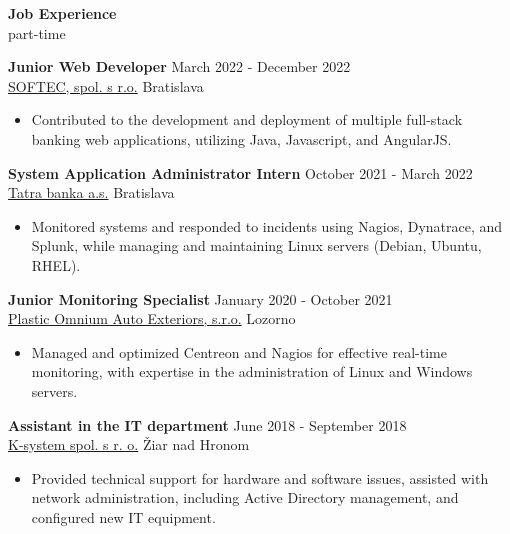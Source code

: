 \documentclass[12pt]{article}
\begin{document}
\vspace{0.2in} %

\begin{center}
	{\noindent \bfseries Job Experience} \\
	{part-time}
\end{center}

\noindent
{\bfseries Junior Web Developer} \hfill March 2022 - December 2022 \\[0.04in]  
\noindent \href{https://www.softec.sk/en/about-us}{SOFTEC, spol. s r.o.} \hfill Bratislava 
\begin{itemize} \itemsep -2pt %
	\item Contributed to the development and deployment of multiple full-stack banking web applications, utilizing Java, Javascript, and AngularJS.
\end{itemize}


\noindent
{\bfseries System Application Administrator Intern} \hfill October 2021 - March 2022 \\[0.04in]  
\noindent \href{https://www.tatrabanka.sk/en/about-bank/about-tatra-banka/}{Tatra banka a.s.} \hfill Bratislava 
\begin{itemize} \itemsep -2pt %
\item Monitored systems and responded to incidents using Nagios, Dynatrace, and Splunk, while managing and maintaining Linux servers (Debian, Ubuntu, RHEL).
\end{itemize}

\noindent
{\bfseries Junior Monitoring Specialist} \hfill January 2020 - October 2021 \\[0.04in]  
\noindent \href{https://www.opmobility.com/en/plastic-omnium-is-now-opmobility/}{Plastic Omnium Auto Exteriors, s.r.o.} \hfill Lozorno 
\begin{itemize} \itemsep -2pt %
\item Managed and optimized Centreon and Nagios for effective real-time monitoring, with expertise in the administration of Linux and Windows servers.
\end{itemize}

\noindent
{\bfseries Assistant in the IT department} \hfill June 2018 - September 2018 \\
\noindent  \href{https://www.ksystem.sk/}{K-system spol. s r. o.} \hfill Žiar nad Hronom   
\begin{itemize} \itemsep -2pt %
\item Provided technical support for hardware and software issues, assisted with network administration, including Active Directory management, and configured new IT equipment.
\end{itemize}
\end{document}
